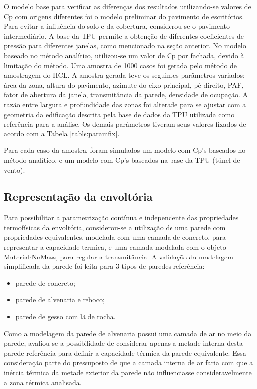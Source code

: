 \documentclass[brazil,hardcopy,openany,a5paper]{ufscthesis}
\begin{document}
		
		O modelo base para verificar as diferenças dos resultados utilizando-se valores de Cp com origens diferentes foi o modelo preliminar do pavimento de escritórios. Para evitar a influência do solo e da cobertura, considerou-se o pavimento intermediário. A base da TPU permite a obtenção de diferentes coeficientes de pressão para diferentes janelas, como mencionado na seção anterior. No modelo baseado no método analítico, utilizou-se um valor de Cp por fachada, devido à limitação do método. Uma amostra de 1000 casos foi gerada pelo método de amostragem do HCL. A amostra gerada teve os seguintes parâmetros variados: área da zona, altura do pavimento, azimute do eixo principal, pé-direito, PAF, fator de abertura da janela, transmitância da parede, densidade de ocupação. A razão entre largura e profundidade das zonas foi alterade para se ajustar com a geometria da edificação descrita pela base de dados da TPU utilizada como referência para a análise. Os demais parâmetros tiveram seus valores fixados de acordo com a Tabela \ref{table:paramfix}.
				
		Para cada caso da amostra, foram simulados um modelo com Cp’s baseados no método analítico, e um modelo com Cp’s baseados na base da TPU (túnel de vento).
		
		\subsection{Representação da envoltória}
		
		Para possibilitar a parametrização contínua e independente das propriedades termofísicas da envoltória, considerou-se a utilização de uma parede com propriedades equivalentes, modelada com uma camada de concreto, para representar a capacidade térmica, e uma camada modelada com o objeto Material:NoMass, para regular a transmitância.
		A validação da modelagem simplificada da parede foi feita para 3 tipos de paredes referência:
		
		\begin{itemize}
			\item parede de concreto;
			\item parede de alvenaria e reboco;
			\item parede de gesso com lã de rocha.
		\end{itemize}
		
		Como a modelagem da parede de alvenaria possui uma camada de ar no meio da parede, avaliou-se a possibilidade de considerar apenas a metade interna desta parede referência para definir a capacidade térmica da parede equivalente. Essa consideração parte do pressuposto de que a camada interna de ar faria com que a inércia térmica da metade exterior da parede não influenciasse consideravelmente a zona térmica analisada.
		
\end{document}
